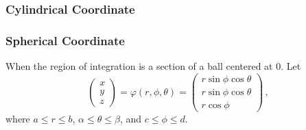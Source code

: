 \documentclass[aspectratio=169]{beamer}
\begin{document}
\begin{frame}
    \frametitle{Cylindrical Coordinate}
\end{frame}

\begin{frame}
    \frametitle{Spherical Coordinate}
    When the region of integration is a section of a ball centered at $0$.
    Let
    \begin{equation*}
        \begin{pmatrix}
            x \\ y \\z
        \end{pmatrix}
        =
        \varphi(r,\phi,\theta) = 
        \begin{pmatrix}
            r\sin\phi\cos\theta\\
            r\sin\phi\cos\theta\\
            r \cos\phi
        \end{pmatrix} \,,
    \end{equation*}
    where $ a \leq r \leq b$, $\alpha \leq \theta \leq \beta$, and 
    $c \leq \phi \leq d$.
\end{frame}
\end{document}
